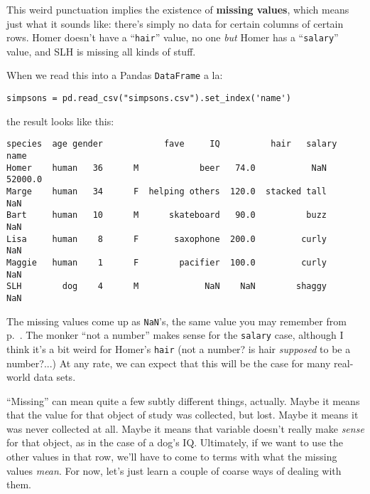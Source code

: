 
This weird punctuation implies the existence of \textbf{missing values}, which
means just what it sounds like: there's simply no data for certain columns of 
certain rows. Homer doesn't have a ``\texttt{hair}'' value, no one \textit{but}
Homer has a ``\texttt{salary}'' value, and SLH is missing all kinds of stuff.

When we read this into a Pandas \texttt{DataFrame} a la:

\begin{Verbatim}[fontsize=\small,samepage=true,frame=single,framesep=3mm]
simpsons = pd.read_csv("simpsons.csv").set_index('name')
\end{Verbatim}

the result looks like this:

\begin{Verbatim}[fontsize=\scriptsize,samepage=true,frame=leftline,framesep=5mm,framerule=1mm]
       species  age gender            fave     IQ          hair   salary
name                                                                    
Homer    human   36      M            beer   74.0           NaN  52000.0
Marge    human   34      F  helping others  120.0  stacked tall      NaN
Bart     human   10      M      skateboard   90.0          buzz      NaN
Lisa     human    8      F       saxophone  200.0         curly      NaN
Maggie   human    1      F        pacifier  100.0         curly      NaN
SLH        dog    4      M             NaN    NaN        shaggy      NaN
\end{Verbatim}


The missing values come up as \texttt{NaN}'s, the same value you may remember
from p.~\pageref{NaN}. The monker ``not a number'' makes sense for the
\texttt{salary} case, although I think it's a bit weird for Homer's
\texttt{hair} (not a number? is hair \textit{supposed} to be a number?...)
At any rate, we can expect that this will be the case for many real-world data
sets.


``Missing'' can mean quite a few subtly different things, actually. Maybe it
means that the value for that object of study was collected, but lost. Maybe it
means it was never collected at all. Maybe it means that variable doesn't
really make \textit{sense} for that object, as in the case of a dog's IQ.
Ultimately, if we want to use the other values in that row, we'll have to come
to terms with what the missing values \textit{mean}. For now, let's just learn
a couple of coarse ways of dealing with them.

